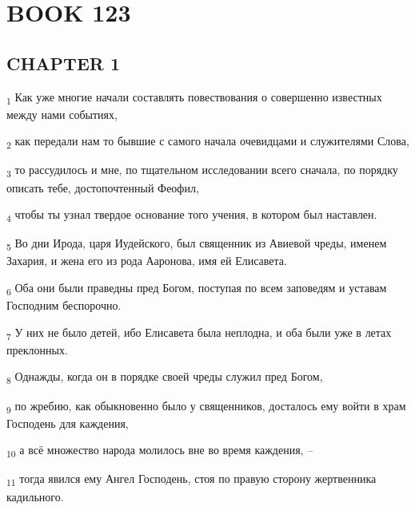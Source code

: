 \section{BOOK 123}
\subsection{CHAPTER 1}
\begin{tcolorbox}
\textsubscript{1} Как уже многие начали составлять повествования о совершенно известных между нами событиях,
\end{tcolorbox}
\begin{tcolorbox}
\textsubscript{2} как передали нам то бывшие с самого начала очевидцами и служителями Слова,
\end{tcolorbox}
\begin{tcolorbox}
\textsubscript{3} то рассудилось и мне, по тщательном исследовании всего сначала, по порядку описать тебе, достопочтенный Феофил,
\end{tcolorbox}
\begin{tcolorbox}
\textsubscript{4} чтобы ты узнал твердое основание того учения, в котором был наставлен.
\end{tcolorbox}
\begin{tcolorbox}
\textsubscript{5} Во дни Ирода, царя Иудейского, был священник из Авиевой чреды, именем Захария, и жена его из рода Ааронова, имя ей Елисавета.
\end{tcolorbox}
\begin{tcolorbox}
\textsubscript{6} Оба они были праведны пред Богом, поступая по всем заповедям и уставам Господним беспорочно.
\end{tcolorbox}
\begin{tcolorbox}
\textsubscript{7} У них не было детей, ибо Елисавета была неплодна, и оба были уже в летах преклонных.
\end{tcolorbox}
\begin{tcolorbox}
\textsubscript{8} Однажды, когда он в порядке своей чреды служил пред Богом,
\end{tcolorbox}
\begin{tcolorbox}
\textsubscript{9} по жребию, как обыкновенно было у священников, досталось ему войти в храм Господень для каждения,
\end{tcolorbox}
\begin{tcolorbox}
\textsubscript{10} а всё множество народа молилось вне во время каждения, --
\end{tcolorbox}
\begin{tcolorbox}
\textsubscript{11} тогда явился ему Ангел Господень, стоя по правую сторону жертвенника кадильного.
\end{tcolorbox}
